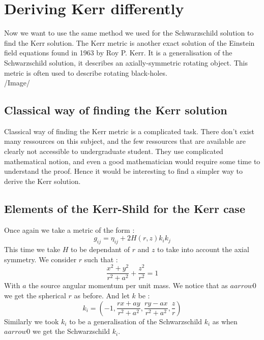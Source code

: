\documentclass[a4paper,12pt]{article}
\theoremstyle{definition}
\begin{document}
\section{Deriving Kerr differently}
Now we want to use the same method we used for the Schwarzschild solution to find the Kerr solution.
The Kerr metric is another exact solution of the Einstein field equations found in 1963 by Roy P. Kerr.
It is a generalisation of the Schwarzschild solution, it describes an axially-symmetric rotating object.
This metric is often used to describe rotating black-holes.\\
/Image/
\subsection{Classical way of finding the Kerr solution}
Classical way of finding the Kerr metric is a complicated task.
There don't exist many ressources on this subject, and the few ressources that are available are clearly not accessible to undergraduate student.
They use complicated mathematical notion, and even a good mathematician would require some time to understand the proof.
Hence it would be interesting to find a simpler way to derive the Kerr solution.
\subsection{Elements of the Kerr-Shild for the Kerr case}
Once again we take a metric of the form :
\begin{equation*}
	g_{ij}=\eta_{ij}+2H(r,z)k_ik_j
\end{equation*}
This time we take $H$ to be dependant of $r$ and $z$ to take into account the axial symmetry.
We consider $r$ such that :
\begin{equation*}
	\frac{x^2+y^2}{r^2+a^2}+\frac{z^2}{r^2}=1
\end{equation*}
With $a$ the source angular momentum per unit mass.
We notice that as $aarrow 0$ we get the spherical $r$ as before.
And let $k$ be :
\begin{equation*}
	k_i=(-1,\frac{r x + a y}{r^2 + a^2},\frac{ry-ax}{r^2+a^2},\frac{z}{r})
\end{equation*}
Similarly we took $k_i$ to be a generalisation of the Schwarzschild $k_i$ as when $aarrow 0$ we get the Schwarzschild $k_i$.
\end{document}

